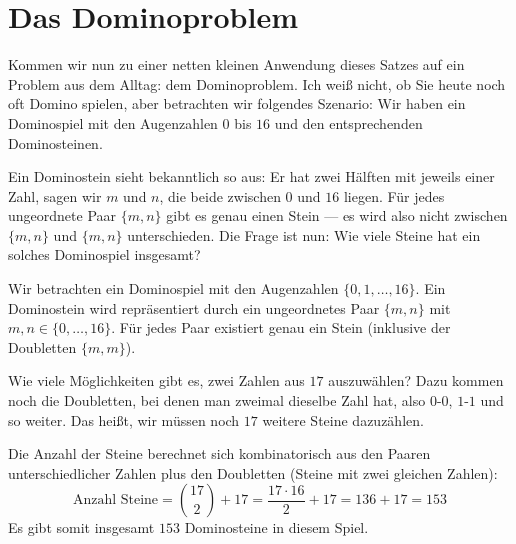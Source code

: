 \section{Das Dominoproblem}

\begin{spoken-clean}[00:20:20 - 00:22:30]
Kommen wir nun zu einer netten kleinen Anwendung dieses Satzes auf ein Problem aus dem Alltag: dem Dominoproblem. Ich weiß nicht, ob Sie heute noch oft Domino spielen, aber betrachten wir folgendes Szenario: Wir haben ein Dominospiel mit den Augenzahlen $0$ bis $16$ und den entsprechenden Dominosteinen.

Ein Dominostein sieht bekanntlich so aus: Er hat zwei Hälften mit jeweils einer Zahl, sagen wir $m$ und $n$, die beide zwischen $0$ und $16$ liegen. Für jedes ungeordnete Paar $\{m, n\}$ gibt es genau einen Stein --- es wird also nicht zwischen $\{m, n\}$ und $\{m, n\}$ unterschieden. Die Frage ist nun: Wie viele Steine hat ein solches Dominospiel insgesamt?
\end{spoken-clean}

\begin{math-stroke}
Wir betrachten ein Dominospiel mit den Augenzahlen $\{0, 1, \dots, 16\}$.
Ein Dominostein wird repräsentiert durch ein ungeordnetes Paar $\{m, n\}$ mit $m, n \in \{0, \dots, 16\}$. Für jedes Paar existiert genau ein Stein (inklusive der Doubletten $\{m, m\}$).
\end{math-stroke}

\begin{spoken-clean}[00:22:30 - 00:23:51]
Wie viele Möglichkeiten gibt es, zwei Zahlen aus $17$ auszuwählen? Dazu kommen noch die Doubletten, bei denen man zweimal dieselbe Zahl hat, also $0$-$0$, $1$-$1$ und so weiter. Das heißt, wir müssen noch $17$ weitere Steine dazuzählen.
\end{spoken-clean}

\begin{ai-global-state-checkpoint-invisible-content}
\end{ai-global-state-checkpoint-invisible-content}

\begin{math-stroke}
Die Anzahl der Steine berechnet sich kombinatorisch aus den Paaren unterschiedlicher Zahlen plus den Doubletten (Steine mit zwei gleichen Zahlen):
\[
\text{Anzahl Steine} = \binom{17}{2} + 17 = \frac{17 \cdot 16}{2} + 17 = 136 + 17 = 153
\]
Es gibt somit insgesamt $153$ Dominosteine in diesem Spiel.
\end{math-stroke}

